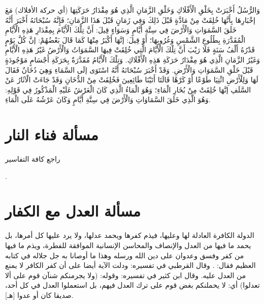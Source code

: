 وَالرُّسُلُ أَخْبَرَتْ بِخَلْقِ الْأَفْلَاكِ وَخَلْقِ الزَّمَانِ الَّذِي هُوَ مِقْدَارُ حَرَكَتِهَا (أي حركة الأفلاك) مَعَ إخْبَارِهَا بِأَنَّهَا خُلِقَتْ مِنْ مَادَّةٍ قَبْلَ ذَلِكَ وَفِي زَمَانٍ قَبْلَ هَذَا الزَّمَانِ؛ فَإِنَّهُ سُبْحَانَهُ أَخْبَرَ أَنَّهُ خَلَقَ السَّمَوَاتِ وَالْأَرْضَ فِي سِتَّةِ أَيَّامٍ وَسَوَاءٍ قِيلَ: أَنَّ تِلْكَ الْأَيَّامَ بِمِقْدَارِ هَذِهِ الْأَيَّامِ الْمُقَدَّرَةِ بِطُلُوعِ الشَّمْسِ وَغُرُوبِهَا؛ أَوْ قِيلَ: إنَّهَا أَكْبَرُ مِنْهَا كَمَا قَالَ بَعْضُهُمْ: إنَّ كُلَّ يَوْمٍ قَدْرُهُ أَلْفُ سَنَةٍ فَلَا رَيْبَ أَنَّ تِلْكَ الْأَيَّامَ الَّتِي خُلِقَتْ فِيهَا السَّمَوَاتُ وَالْأَرْضُ غَيْرُ هَذِهِ الْأَيَّامِ وَغَيْرُ الزَّمَانِ الَّذِي هُوَ مِقْدَارُ حَرَكَةِ هَذِهِ الْأَفْلَاكِ. وَتِلْكَ الْأَيَّامُ مُقَدَّرَةٌ بِحَرَكَةِ أَجْسَامٍ مَوْجُودَةٍ قَبْلَ خَلْقِ السَّمَوَاتِ وَالْأَرْضِ. وَقَدْ أَخْبَرَ سُبْحَانَهُ أَنَّهُ {اسْتَوَى إلَى السَّمَاءِ وَهِيَ دُخَانٌ فَقَالَ لَهَا وَلِلْأَرْضِ ائْتِيَا طَوْعًا أَوْ كَرْهًا قَالَتَا أَتَيْنَا طَائِعِينَ} فَخُلِقَتْ مِنْ الدُّخَانِ وَقَدْ جَاءَتْ الْآثَارُ عَنْ السَّلَفِ إنَّهَا خُلِقَتْ مِنْ بُخَارِ الْمَاءِ؛ وَهُوَ الْمَاءُ الَّذِي كَانَ الْعَرْشُ عَلَيْهِ الْمَذْكُورُ فِي قَوْلِهِ: {وَهُوَ الَّذِي خَلَقَ السَّمَاوَاتِ وَالْأَرْضَ فِي سِتَّةِ أَيَّامٍ وَكَانَ عَرْشُهُ عَلَى الْمَاءِ}.

\section{مسألة فناء النار}

راجع كافة التفاسير

\quranayah*[11][106-108]{\footnotesize \surahname*[11]}.


\section{مسألة العدل مع الكفار}
\label{sec:app_justice}

الدولة الكافرة العادلة لها وعليها، فيذم كفرها ويحمد عدلها، ولا يرد عليها كل أمرها، بل يحمد ما فيها من العدل والإنصاف والمحاسن الإنسانية الموافقة للفطرة، ويذم ما فيها من كفر وفسق وعدوان على دين الله ورسله وهذا ما أوصانا به جل جلاله في كتابه العظيم فقال: 
\quranayah*[5][8]{\footnotesize \surahname*[5]}. وقال القرطبي في تفسيره: ودلت الآية أيضا على أن كفر الكافر لا يمنع من العدل عليه. وقال ابن كثير في تفسيره: وقوله: (ولا يجرمنكم شنآن قوم على ألا تعدلوا) أي: لا يحملنكم بغض قوم على ترك العدل فيهم، بل استعملوا العدل في كل أحد، صديقا كان أو عدوا [هـ]. 


